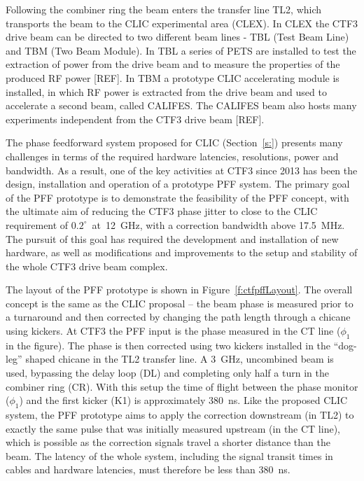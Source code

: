 Following the combiner ring the beam enters the transfer line TL2, which transports the beam to the CLIC experimental area (CLEX). In CLEX the CTF3 drive beam can be directed to two different beam lines - TBL (Test Beam Line) and TBM (Two Beam Module). In TBL a series of PETS are installed to test the extraction of power from the drive beam and to measure the properties of the produced RF power [REF]. In TBM a prototype CLIC accelerating module is installed, in which RF power is extracted from the drive beam and used to accelerate a second beam, called CALIFES. The CALIFES beam also hosts many experiments independent from the CTF3 drive beam [REF].


The phase feedforward system proposed for CLIC (Section~\ref{s:}) presents many challenges in terms of the required hardware latencies, resolutions, power and bandwidth. As a result, one of the key activities at CTF3 since 2013 has been the design, installation and operation of a prototype PFF system. The primary goal of the PFF prototype is to demonstrate the feasibility of the PFF concept, with the ultimate aim of reducing the CTF3 phase jitter to close to the CLIC requirement of \(0.2^\circ\)~at~12~GHz, with a correction bandwidth above 17.5~MHz. The pursuit of this goal has required the development and installation of new hardware, as well as modifications and improvements to the setup and stability of the whole CTF3 drive beam complex.

The layout of the PFF prototype is shown in Figure~\ref{f:ctfpffLayout}. The overall concept is the same as the CLIC proposal -- the beam phase is measured prior to a turnaround and then corrected by changing the path length through a chicane using kickers. At CTF3 the PFF input is the phase measured in the CT line (\(\phi_1\) in the figure). The phase is then corrected using two kickers installed in the ``dog-leg'' shaped chicane in the TL2 transfer line.  A 3~GHz, uncombined beam is used, bypassing the delay loop (DL) and completing only half a turn in the combiner ring (CR). With this setup the time of flight between the phase monitor (\(\phi_1\)) and the first kicker (K1) is approximately 380~ns. Like the proposed CLIC system, the PFF prototype aims to apply the correction downstream (in TL2) to exactly the same pulse that was initially measured upstream (in the CT line), which is possible as the correction signals travel a shorter distance than the beam. The latency of the whole system, including the signal transit times in cables and hardware latencies, must therefore be less than 380~ns.

